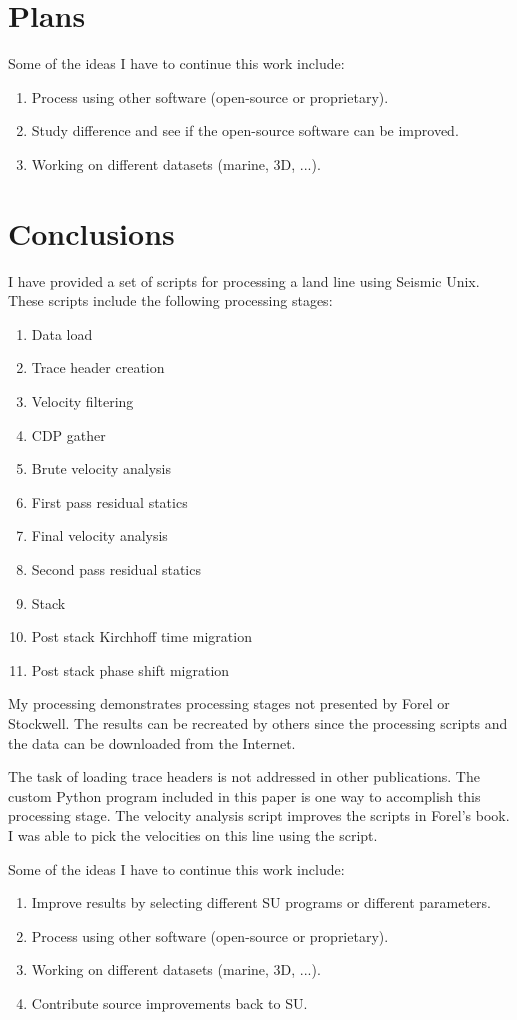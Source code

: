 \section{Plans}
Some of the ideas I have to continue this work include:

\begin{enumerate}
\item Process using other software (open-source or proprietary). 
\item Study difference and see if the open-source software can be improved.
\item Working on different datasets (marine, 3D, ...).
\end{enumerate}

\section{Conclusions}
I have provided a set of scripts for processing a land line using
Seismic Unix. These scripts include the following processing stages:
\begin{enumerate}
\item Data load
\item Trace header creation
\item Velocity filtering 
\item CDP gather
\item Brute velocity analysis
\item First pass residual statics
\item Final velocity analysis
\item Second pass residual statics
\item Stack
\item Post stack Kirchhoff time migration
\item Post stack phase shift migration
\end{enumerate}

My processing demonstrates processing stages not presented by Forel
or Stockwell. The results can be recreated by others since the processing
scripts and the data can be downloaded from the Internet.

The task of loading trace headers is not addressed in other
publications.  The custom Python program included in this paper is one
way to accomplish this processing stage.  The velocity analysis script 
improves the scripts in Forel's book.  I was able to pick the velocities 
on this line using the script.

Some of the ideas I have to continue this work include:
\begin{enumerate}
\item Improve results by selecting different SU programs or different 
parameters. 
\item Process using other software (open-source or proprietary).
\item Working on different datasets (marine, 3D, ...).
\item Contribute source improvements back to SU.
\end{enumerate}

